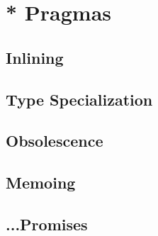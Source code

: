 
\chapter{* Pragmas}
\section{Inlining}
\section{Type Specialization}
\section{Obsolescence}
\section{Memoing}
\section{...Promises}



